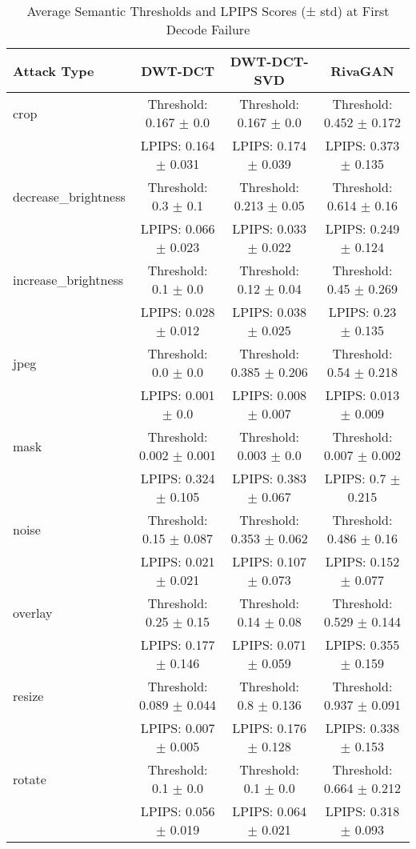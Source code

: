 \begin{table}[ht]
\centering
\caption{Average Semantic Thresholds and LPIPS Scores (± std) at First Decode Failure}
\label{tab:avg_normalized_threshold_lpips}
\renewcommand{\arraystretch}{1.2}
\begin{tabular}{|l|c|c|c|}
\hline
\textbf{Attack Type} & \textbf{DWT-DCT} & \textbf{DWT-DCT-SVD} & \textbf{RivaGAN} \\
\hline
crop & Threshold: 0.167 $\pm$ 0.0 & Threshold: 0.167 $\pm$ 0.0 & Threshold: 0.452 $\pm$ 0.172 \\
 & LPIPS: 0.164 $\pm$ 0.031 & LPIPS: 0.174 $\pm$ 0.039 & LPIPS: 0.373 $\pm$ 0.135 \\
\hline
decrease_brightness & Threshold: 0.3 $\pm$ 0.1 & Threshold: 0.213 $\pm$ 0.05 & Threshold: 0.614 $\pm$ 0.16 \\
 & LPIPS: 0.066 $\pm$ 0.023 & LPIPS: 0.033 $\pm$ 0.022 & LPIPS: 0.249 $\pm$ 0.124 \\
\hline
increase_brightness & Threshold: 0.1 $\pm$ 0.0 & Threshold: 0.12 $\pm$ 0.04 & Threshold: 0.45 $\pm$ 0.269 \\
 & LPIPS: 0.028 $\pm$ 0.012 & LPIPS: 0.038 $\pm$ 0.025 & LPIPS: 0.23 $\pm$ 0.135 \\
\hline
jpeg & Threshold: 0.0 $\pm$ 0.0 & Threshold: 0.385 $\pm$ 0.206 & Threshold: 0.54 $\pm$ 0.218 \\
 & LPIPS: 0.001 $\pm$ 0.0 & LPIPS: 0.008 $\pm$ 0.007 & LPIPS: 0.013 $\pm$ 0.009 \\
\hline
mask & Threshold: 0.002 $\pm$ 0.001 & Threshold: 0.003 $\pm$ 0.0 & Threshold: 0.007 $\pm$ 0.002 \\
 & LPIPS: 0.324 $\pm$ 0.105 & LPIPS: 0.383 $\pm$ 0.067 & LPIPS: 0.7 $\pm$ 0.215 \\
\hline
noise & Threshold: 0.15 $\pm$ 0.087 & Threshold: 0.353 $\pm$ 0.062 & Threshold: 0.486 $\pm$ 0.16 \\
 & LPIPS: 0.021 $\pm$ 0.021 & LPIPS: 0.107 $\pm$ 0.073 & LPIPS: 0.152 $\pm$ 0.077 \\
\hline
overlay & Threshold: 0.25 $\pm$ 0.15 & Threshold: 0.14 $\pm$ 0.08 & Threshold: 0.529 $\pm$ 0.144 \\
 & LPIPS: 0.177 $\pm$ 0.146 & LPIPS: 0.071 $\pm$ 0.059 & LPIPS: 0.355 $\pm$ 0.159 \\
\hline
resize & Threshold: 0.089 $\pm$ 0.044 & Threshold: 0.8 $\pm$ 0.136 & Threshold: 0.937 $\pm$ 0.091 \\
 & LPIPS: 0.007 $\pm$ 0.005 & LPIPS: 0.176 $\pm$ 0.128 & LPIPS: 0.338 $\pm$ 0.153 \\
\hline
rotate & Threshold: 0.1 $\pm$ 0.0 & Threshold: 0.1 $\pm$ 0.0 & Threshold: 0.664 $\pm$ 0.212 \\
 & LPIPS: 0.056 $\pm$ 0.019 & LPIPS: 0.064 $\pm$ 0.021 & LPIPS: 0.318 $\pm$ 0.093 \\
\hline
\end{tabular}
\end{table}